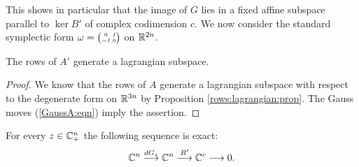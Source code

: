 This shows in particular that the image of $G$ lies in a fixed affine subspace parallel to $\ker B'$ of complex codimension $c$. We now consider the standard symplectic form $\omega = \matr 0{I}{-I}0$ on $\mathbb{R}^{2n}$. 
\begin{prop} \label{rows:lagrangian2:prop}
The rows of $A'$ generate a lagrangian subspace.
\end{prop}
\begin{proof}
We know that the rows of $A$ generate a lagrangian subspace with respect to the degenerate form on $\mathbb{R}^{3n}$ by Proposition \ref{rows:lagrangian:prop}. The Gauss moves (\ref{GaussA:eqn}) imply the assertion.
\end{proof}

\begin{prop} \label{Choi:prop}
For every $z\in \mathbb{C}_+^n$ the following sequence is exact:
$$ \mathbb{C}^n \stackrel{dG_{z}} \longrightarrow \mathbb{C}^n \stackrel {B'} \longrightarrow \mathbb{C}^c \longrightarrow 0.$$
\end{prop}
